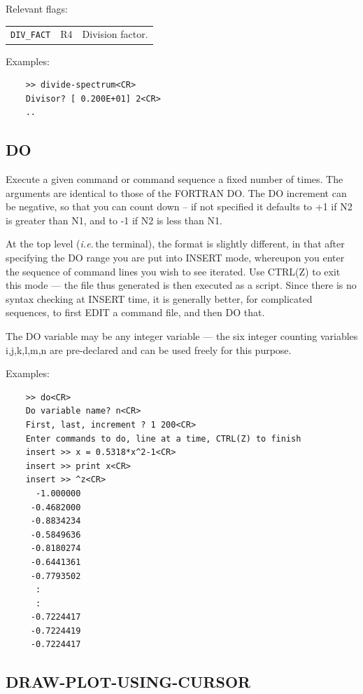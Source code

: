 \documentclass[11pt,twoside]{report}
\newcommand{\ie}{{\it i.e.\,}}
\begin{document}
Relevant flags:\\
\begin{tabular}{lll}
  \verb+DIV_FACT+ & R4 & Division factor.
\end{tabular}

Examples:
\begin{verbatim}
    >> divide-spectrum<CR>
    Divisor? [ 0.200E+01] 2<CR>
    ..
\end{verbatim}

\subsection{DO}  

Execute a given command or command sequence a fixed number of times.
The arguments are identical to those of the FORTRAN DO. The DO increment
can be negative, so that you can count down -- if not specified it defaults
to +1 if N2 is greater than N1, and to -1 if N2 is less than N1.

At the top level (\ie the terminal), the format is slightly different, in
that after specifying the DO range you are put into INSERT mode, whereupon
you enter the sequence of command lines you wish to see iterated. Use
CTRL(Z) to exit this mode --- the file thus generated is then executed as
a script.
Since there is no syntax checking at INSERT time,
it is generally better, for complicated sequences, to first EDIT a command
file, and then DO that.

The DO variable may be any integer variable --- the six integer counting
variables i,j,k,l,m,n are pre-declared and can be used freely for this purpose.

Examples:
\begin{verbatim}
    >> do<CR>
    Do variable name? n<CR>
    First, last, increment ? 1 200<CR>
    Enter commands to do, line at a time, CTRL(Z) to finish
    insert >> x = 0.5318*x^2-1<CR>
    insert >> print x<CR>
    insert >> ^z<CR>
      -1.000000
     -0.4682000
     -0.8834234
     -0.5849636
     -0.8180274
     -0.6441361
     -0.7793502
      :
      :
     -0.7224417
     -0.7224419
     -0.7224417
\end{verbatim}

\subsection{DRAW-PLOT-USING-CURSOR} 
\end{document}
